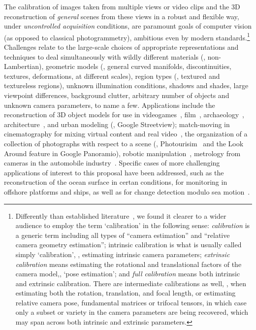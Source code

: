 The calibration of images taken from multiple views or
video clips and the 3D reconstruction of \emph{general} scenes from these views in a
robust and flexible way, under \emph{uncontrolled acquisition} conditions, are 
paramount goals of computer vision (as opposed to classical photogrammetry),
ambitious even by modern standards.\footnote{Differently than established
literature~\cite{Hartley:Zisserman:multiple:view}, we
found it clearer to a wider audience to employ the term `calibration' in the following sense:
\emph{calibration} is a generic term including all types of ``camera estimation'' and ``relative camera geometry estimation'';
intrinsic calibration is what is usually called simply `calibration', \ie, 
estimating intrinsic camera parameters; 
\emph{extrinsic calibration} means estimating the rotational and translational factors
of the camera model,\ie, `pose estimation'; and \emph{full calibration} means both intrinsic
and extrinsic calibration. There are intermediate calibrations as well, \eg, when estimating both the
rotation, translation, and focal length, or estimating relative
camera pose, fundamental matrices or trifocal tensors, in which case only a
subset or variety in the camera parameters are being recovered, which may span across both
intrinsic and extrinsic parameters.}
%
Challenges relate to the large-scale
choices of appropriate representations and techniques to deal simultaneously
with wildly different materials (\eg, non-Lambertian), geometric models (\eg,
general curved manifolds, discontinuities, textures, deformations, at different
scales), region types (\eg, textured and textureless regions), unknown
illumination conditions, shadows and shades, large viewpoint differences,
background clutter, arbitrary number of objects and unknown camera parameters,
to name a few.  
%
Applications include the reconstruction of 3D object models for use in
videogames~\cite{Ablan:3DPhoto:book},
film~\cite{Ablan:3DPhoto:book,Kitagawa:Mocap:book},
archaeology~\cite{Gay:etal:ACVA10,Luhmann:Photogrammetry:book},
architecture~\cite{Luhmann:Photogrammetry:book}, and urban modeling (\eg,
Google Streetview); match-moving in cinematography for mixing virtual content
and real video~\cite{Dobbert:Matchmoving:book}, the organization of a
collection of photographs with respect to a scene (\eg,
Photourisim~\cite{Argarwal:Snavely:etal:ICCV09} and the Look Around feature in
Google Panoramio), robotic manipulation~\cite{Horn:Robot:Vision}, metrology
from cameras in the automobile industry~\cite{Luhmann:Photogrammetry:book}.
Specific cases of more challenging applications of interest to this proposal
have been addressed, such as the reconstruction of the ocean surface in certan
conditions, for monitoring in offshore platforms and ships, as well as for
change detection modulo sea
motion~\cite{Benetazzo:CE2006,Benetazzo:CE2012,Gallego:etal:TGRS201,Fedele:etal:OM2013,Fedele:etal:MCS2012,Benetazzo:etal:CE2016,Gallego:etal:TIP2013,Bergamasco:etal:CG2016,Rapizo:etal:JCR2015,Fabbri:WaterWaves2016,Fabbri:WaterWaves2017,Souza:Fabbri:WaterWaves2017}.

